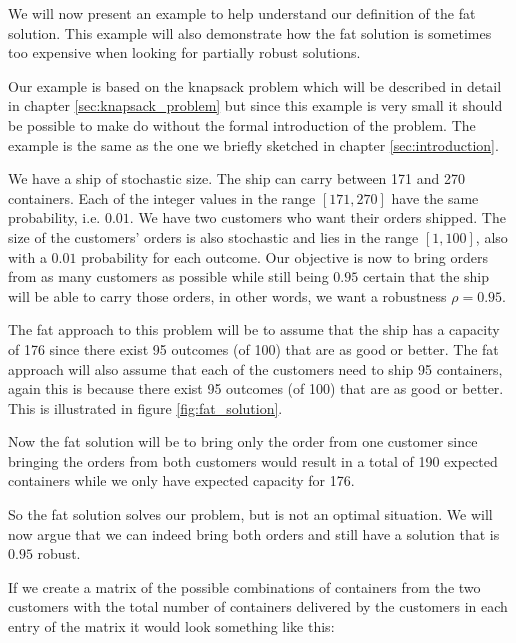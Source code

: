 We will now present an example to help understand our definition of
the fat solution. This example will also demonstrate how the fat
solution is sometimes too expensive when looking for partially robust
solutions.

\begin{example}
\label{ex:worst_case_example}
Our example is based on the knapsack problem which will be described
in detail in chapter \ref{sec:knapsack_problem} but since this example
is very small it should be possible to make do without the formal
introduction of the problem. The example is the same as the one we
briefly sketched in chapter \ref{sec:introduction}.

We have a ship of stochastic size. The ship can carry between 171 and
270 containers. Each of the integer values in the range $[171,270]$
have the same probability, i.e. $0.01$. We have two customers who want
their orders shipped. The size of the customers' orders is also
stochastic and lies in the range $[1,100]$, also with a $0.01$
probability for each outcome. Our objective is now to bring orders from
as many customers as possible while still being $0.95$ certain that
the ship will be able to carry those orders, in other words, we want a
robustness $\rho = 0.95$.

The fat approach to this problem will be to assume that the ship has a
capacity of 176 since there exist 95 outcomes (of 100) that are as good or
better. The fat approach will also assume that each of the
customers need to ship 95 containers, again this is because there
exist 95 outcomes (of 100) that are as good or better. This is
illustrated in figure \ref{fig:fat_solution}.


Now the fat solution will be to bring only the order from one customer
since bringing the orders from both customers would result in a total
of 190 expected containers while we only have expected capacity for 176.

So the fat solution solves our problem, but is not an optimal
situation. We will now argue that we can indeed bring both orders and
still have a solution that is $0.95$ robust.

If we create a matrix of the possible combinations of containers from
the two customers with the total number of containers delivered by the
customers in each entry of the matrix it would look something like this:


\end{example}
